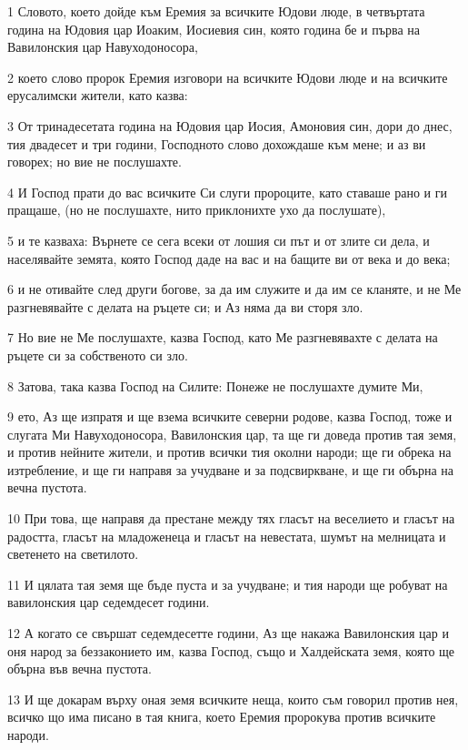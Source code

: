 \par 1 Словото, което дойде към Еремия за всичките Юдови люде, в четвъртата година на Юдовия цар Иоаким, Иосиевия син, която година бе и първа на Вавилонския цар Навуходоносора,
\par 2 което слово пророк Еремия изговори на всичките Юдови люде и на всичките ерусалимски жители, като казва:
\par 3 От тринадесетата година на Юдовия цар Иосия, Амоновия син, дори до днес, тия двадесет и три години, Господното слово дохождаше към мене; и аз ви говорех; но вие не послушахте.
\par 4 И Господ прати до вас всичките Си слуги пророците, като ставаше рано и ги пращаше, (но не послушахте, нито приклонихте ухо да послушате),
\par 5 и те казваха: Върнете се сега всеки от лошия си път и от злите си дела, и населявайте земята, която Господ даде на вас и на бащите ви от века и до века;
\par 6 и не отивайте след други богове, за да им служите и да им се кланяте, и не Ме разгневявайте с делата на ръцете си; и Аз няма да ви сторя зло.
\par 7 Но вие не Ме послушахте, казва Господ, като Ме разгневявахте с делата на ръцете си за собственото си зло.
\par 8 Затова, така казва Господ на Силите: Понеже не послушахте думите Ми,
\par 9 ето, Аз ще изпратя и ще взема всичките северни родове, казва Господ, тоже и слугата Ми Навуходоносора, Вавилонския цар, та ще ги доведа против тая земя, и против нейните жители, и против всички тия околни народи; ще ги обрека на изтребление, и ще ги направя за учудване и за подсвиркване, и ще ги обърна на вечна пустота.
\par 10 При това, ще направя да престане между тях гласът на веселието и гласът на радостта, гласът на младоженеца и гласът на невестата, шумът на мелницата и светенето на светилото.
\par 11 И цялата тая земя ще бъде пуста и за учудване; и тия народи ще робуват на вавилонския цар седемдесет години.
\par 12 А когато се свършат седемдесетте години, Аз ще накажа Вавилонския цар и оня народ за беззаконието им, казва Господ, също и Халдейската земя, която ще обърна във вечна пустота.
\par 13 И ще докарам върху оная земя всичките неща, които съм говорил против нея, всичко що има писано в тая книга, което Еремия пророкува против всичките народи.
